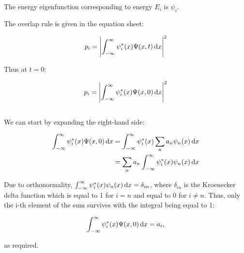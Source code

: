 \subsection{}

The energy eigenfunction corresponding to energy $E_i$ is $\psi_i$.

The overlap rule is given in the equation sheet:

\begin{align*}
  p_i = \abs{\int_{-\infty}^{\infty} \psi^{*}_{i}(x) \Psi(x,t) \dif{x}}^2
\end{align*}

Thus at $t=0$:

\begin{align*}
  p_i = \abs{\int_{-\infty}^{\infty} \psi^{*}_{i}(x) \Psi(x,0) \dif{x}}^2
\end{align*}

\subsection{}

We can start by expanding the right-hand side:

\begin{align*}
  \int_{-\infty}^{\infty} \psi^{*}_{i}(x) \Psi(x,0) \dif{x}
    = \int_{-\infty}^{\infty} \psi^{*}_{i}(x) \sum_n a_n \psi_n(x) \dif{x} \\
    = \sum_n a_n \int_{-\infty}^{\infty} \psi^{*}_{i}(x) \psi_n(x) \dif{x}
\end{align*}

Due to orthonormality, $\int_{-\infty}^{\infty} \psi^{*}_{i}(x) \psi_n(x) \dif{x} = \delta_{in}$, where $\delta_{in}$ is the Kroenecker delta function which is equal to 1 for $i=n$ and equal to 0 for $i \neq n$. Thus, only the i-th element of the sum survives with the integral being equal to 1:

\begin{align*}
  \int_{-\infty}^{\infty} \psi^{*}_{i}(x) \Psi(x,0) \dif{x}
    = a_i,
\end{align*}

as required.
